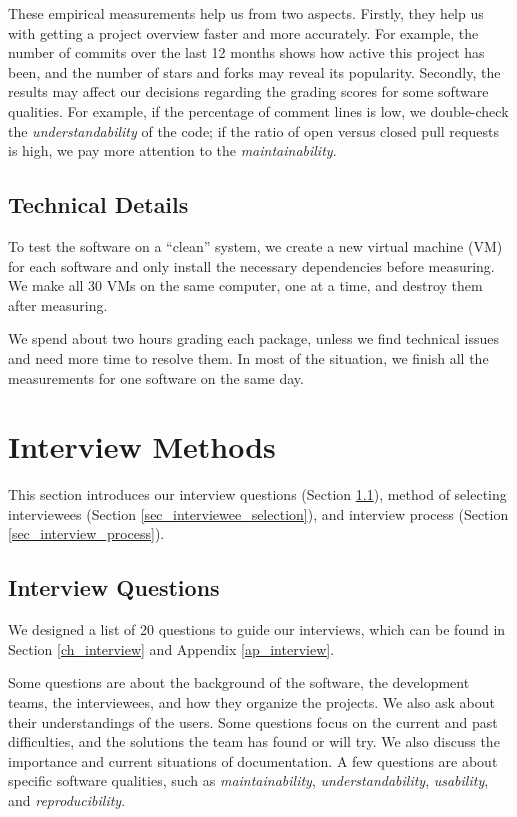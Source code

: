 These empirical measurements help us from two aspects. Firstly, they help us with getting a project overview faster and more accurately. For example, the number of commits over the last 12 months shows how active this project has been, and the number of stars and forks may reveal its popularity. Secondly, the results may affect our decisions regarding the grading scores for some software qualities. For example, if the percentage of comment lines is low, we double-check the \textit{understandability} of the code; if the ratio of open versus closed pull requests is high, we pay more attention to the \textit{maintainability}.

\subsection{Technical Details}
\label{sec_technical_details}
To test the software on a ``clean'' system, we create a new virtual machine (VM) for each software and only install the necessary dependencies before measuring. We make all 30 VMs on the same computer, one at a time, and destroy them after measuring.

We spend about two hours grading each package, unless we find technical issues and need more time to resolve them. In most of the situation, we finish all the measurements for one software on the same day.

\section{Interview Methods}
\label{sec_interview_methods}

This section introduces our interview questions (Section \ref{sec_interview_questions}), method of selecting interviewees (Section \ref{sec_interviewee_selection}), and interview process (Section \ref{sec_interview_process}).

\subsection{Interview Questions}
\label{sec_interview_questions}
We designed a list of 20 questions to guide our interviews, which can be found in Section \ref{ch_interview} and Appendix \ref{ap_interview}.

Some questions are about the background of the software, the development teams, the interviewees, and how they organize the projects. We also ask about their understandings of the users. Some questions focus on the current and past difficulties, and the solutions the team has found or will try. We also discuss the importance and current situations of documentation. A few questions are about specific software qualities, such as \textit{maintainability}, \textit{understandability}, \textit{usability}, and \textit{reproducibility}.

